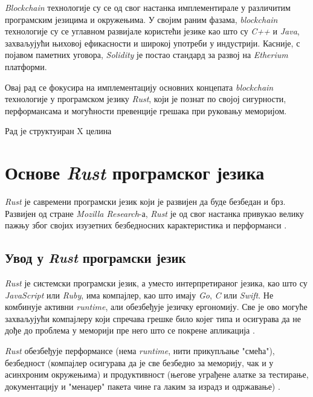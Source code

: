 \documentclass[12pt, a4paper]{article}
\begin{document}
\textit{Blockchain} технологије су се од свог настанка имплементирале у различитим програмским језицима и окружењима. У својим раним фазама, \textit{blockchain} технологије су се углавном развијале користећи језике као што су \textit{C++} и \textit{Java}, захваљујући њиховој ефикасности и широкој употреби у индустрији. Касније, с појавом паметних уговора, \textit{Solidity} је постао стандард за развој на \textit{Etherium} платформи.

Овај рад се фокусира на имплементацију основних концепата \textit{blockchain} технологије у програмском језику \textit{Rust}, који је познат по својој сигурности, перформансама и могућности превенције грешака при руковању меморијом.

Рад је структуиран X целина
\pagebreak

\section{Основе \textit{Rust} програмског језика}
\textit{Rust} је савремени програмски језик који је развијен да буде безбедан и брз. Развијен од стране \textit{Mozilla Research}-а, \textit{Rust} је од свог настанка привукао велику пажњу због својих изузетних безбедносних карактеристика и перформанси \cite{5}.

\subsection{Увод у \textit{Rust} програмски језик}
\textit{Rust} је системски програмски језик, а уместо интерпретираног језика, као што су \textit{JavaScript} или \textit{Ruby}, има компајлер, као што имају \textit{Go}, \textit{C} или \textit{Swift}. Не комбинује активни \textit{runtime}, али обезбеђује језичку ергономију. Све је ово могуће захваљујући компајлеру који спречава грешке било којег типа и осигурава да не дође до проблема у меморији пре него што се покрене апликација \cite{6}.

\textit{Rust} обезбеђује перформансе (нема \textit{runtime}, нити прикупљање "смећа"), безбедност (компајлер осигурава да је све безбедно за меморију, чак и у асинхроним окружењима) и продуктивност (његове уграђене алатке за тестирање, документацију и "менаџер" пакета чине га лаким за израдз и одржавање) \cite{6}. 
\end{document}
